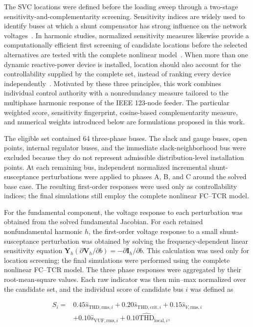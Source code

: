 \documentclass[journal]{IEEEtran}
\begin{document}
The SVC locations were defined before the loading sweep through a two-stage
sensitivity-and-complementarity screening. Sensitivity indices are widely
used to identify buses at which a shunt compensator has strong influence on
the network voltages~\cite{JainDahiya2016SVCPlacement}. In harmonic studies,
normalized sensitivity measures likewise provide a computationally efficient
first screening of candidate locations before the selected alternatives are
tested with the complete nonlinear model~\cite{AuMilanovic2007HarmonicPlacement}.
When more than one dynamic reactive-power device is installed, location should
also account for the controllability supplied by the complete set, instead of
ranking every device independently~\cite{Qi2017DynamicVarPlacement}. Motivated
by these three principles, this work combines individual control authority
with a nonredundancy measure tailored to the multiphase harmonic response of
the IEEE 123-node feeder. The particular weighted score, sensitivity
fingerprint, cosine-based complementarity measure, and numerical weights
introduced below are formulations proposed in this work.

The eligible set contained 64
three-phase buses. The slack and gauge buses, open points, internal regulator
buses, and the immediate slack-neighborhood bus were excluded because they do
not represent admissible distribution-level installation points. At each
remaining bus, independent normalized incremental shunt-susceptance
perturbations were applied to phases A, B, and C around the solved base case.
The resulting first-order responses were used only as controllability indices;
the final simulations still employ the complete nonlinear FC--TCR model.

For the fundamental component, the voltage response to each perturbation was
obtained from the solved fundamental Jacobian. For each retained
nonfundamental harmonic $h$, the first-order voltage response to a small
shunt-susceptance perturbation was obtained by solving the frequency-dependent
linear sensitivity equation
$\bm{Y}_{h}(\partial\bm{V}_{h}/\partial b)
=-\partial\bm{I}_{h}/\partial b$. This calculation was used only for location
screening; the final simulations were performed using the complete nonlinear
FC--TCR model. The three phase responses were aggregated by their
root-mean-square values. Each raw indicator was then min--max normalized over
the candidate set, and the individual score of candidate bus $i$ was defined
as

\begin{equation}
\begin{split}
S_i={}&0.45\widehat{s}_{\mathrm{THD,rms},i}
 +0.20\widehat{s}_{\mathrm{THD,crit},i}
 +0.15\widehat{s}_{V,\mathrm{rms},i}\\
 &+0.10\widehat{s}_{\mathrm{VUF,rms},i}
 +0.10\widehat{\mathrm{THD}}_{\mathrm{local},i},
\end{split}
\label{eq:svc_location_individual_score}
\end{equation}
\end{document}
